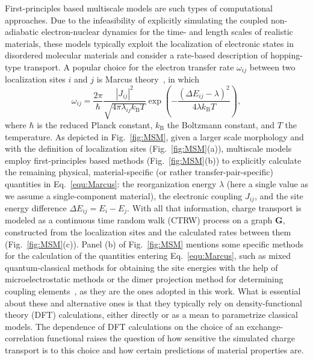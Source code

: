 \documentclass[%
 reprint,
superscriptaddress,
 amsmath,amssymb,
 aps,
prb,
floatfix
]{revtex4-2}
\newcommand{\bjoern}[2]{{\color{blue}{{\bf #1} #2}}}
\begin{document}
First-principles based multiscale models are such types of computational approaches. Due to the infeasibility of explicitly simulating the coupled non-adiabatic electron-nuclear dynamics for the time- and length scales of realistic materials, these models typically exploit the localization of electronic states in disordered molecular materials and consider a rate-based description of hopping-type transport. A popular choice for the electron transfer rate $\omega_{ij}$ between two localization sites $i$ and $j$ is Marcus theory~\bjoern{add}{citation}, in which
%
\begin{equation}
    \omega_{ij} = \frac{2\pi}{\hbar} \frac{|J_{ij}|^2}{\sqrt{4\pi \lambda_{ij} k_\text{B}T}} \exp\left(-\frac{(\Delta E_{ij} - \lambda)^2}{4\lambda k_\text{B}T}\right) ,
    \label{equ:Marcus}
\end{equation}
%
where $\hbar$ is the reduced Planck constant,  $k_\text{B}$ the Boltzmann constant, and $T$ the temperature. As depicted in Fig.~\ref{fig:MSM}, given a larger scale morphology and with the definition of localization sites (Fig.~\ref{fig:MSM}(a)), multiscale models employ first-principles based methods (Fig.~\ref{fig:MSM}(b)) to explicitly calculate the remaining physical, material-specific (or rather transfer-pair-specific) quantities in Eq.~\ref{equ:Marcus}: the reorganization energy $\lambda$ (here a single value as we assume a single-component material), the electronic coupling $J_{ij}$, and the site energy difference $\Delta E_{ij} = E_i - E_j$. With all that information, charge transport is modeled as a continuous time random walk (CTRW) process on a graph $\mathbf{G}$, constructed from the localization sites and the calculated rates between them (Fig.~\ref{fig:MSM}(c)). Panel (b) of Fig.~\ref{fig:MSM} mentions some specific methods for the calculation of the quantities entering Eq.~\ref{equ:Marcus}, such as mixed quantum-classical methods for obtaining the site energies with the help of microelectrostatic methods \bjoern{add}{citations} or the dimer projection method for determining coupling elements~\cite{baumeier_density_2010}, as they are the ones adopted in this work. What is essential about these and alternative ones is that they typically rely on density-functional theory (DFT) calculations, either directly or as a mean to parametrize classical models. The dependence of DFT calculations on the choice of an exchange-correlation functional raises the question of how sensitive the simulated charge transport is to this choice and how certain predictions of material properties are. 
\end{document}
